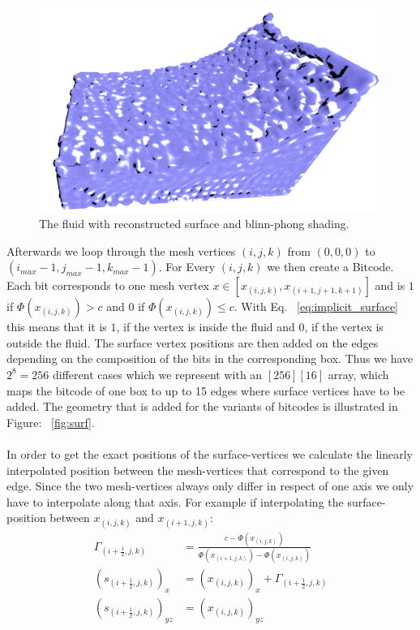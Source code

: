 \documentclass{ACGSeminar}
\begin{document}
\begin{figure}[b!] 
  \begin{centering}
    \includegraphics[width=15cm]{figures/Surface.png}\par
  \end{centering}
  \caption{The fluid with reconstructed surface and blinn-phong shading.}
  \label{fig:particle_shader}
\end{figure}
Afterwards we loop through the mesh vertices \((i,j,k)\)  from \((0,0,0)\) to \((i_{max}-1,j_{max}-1,k_{max}-1)\). For Every \((i,j,k)\) we then create a Bitcode. Each bit corresponds to one mesh vertex \(x \in [x_{(i,j,k)}, x_{(i+1,j+1,k+1)}] \) and is \(1\) if \(\Phi(x_{(i,j,k)}) > c\) and \(0\) if \(\Phi(x_{(i,j,k)}) \leq c\). With Eq. ~\ref{eq:implicit_surface} this means that it is \(1\), if the vertex is inside the fluid and \(0\), if the vertex is outside the fluid. The surface vertex positions are then added on the edges depending on the composition of the bits in the corresponding box. Thus we have \(2^8 = 256\) different cases which we represent with an \([256][16]\) array, which maps the bitcode of one box to up to 15 edges where surface vertices have to be added. The geometry that is added for the variants of bitcodes is illustrated in Figure: ~\ref{fig:surf}. \\
\\
In order to get the exact positions of the surface-vertices we calculate the linearly interpolated position between the mesh-vertices that correspond to the given edge. Since the two mesh-vertices always only differ in respect of one axis we only have to interpolate along that axis. For example if interpolating the surface-position between \(x_{(i,j,k)}\) and \(x_{(i+1,j,k)}\):
\begin{equation} \label{eq:implicit_surface}
\begin{aligned}
\Gamma_{(i+\frac{1}{2},j,k)} &= \frac{c - \Phi(x_{(i,j,k)})}{\Phi(x_{(i+1,j,k)}) -\Phi(x_{(i,j,k)})} \\
(s_{(i+\frac{1}{2},j,k)})_x &= (x_{(i,j,k)})_x + \Gamma_{(i+\frac{1}{2},j,k)} \\
(s_{(i+\frac{1}{2},j,k)})_{yz} &= (x_{(i,j,k)})_{yz}
\end{aligned} 
\end{equation}
\end{document}
